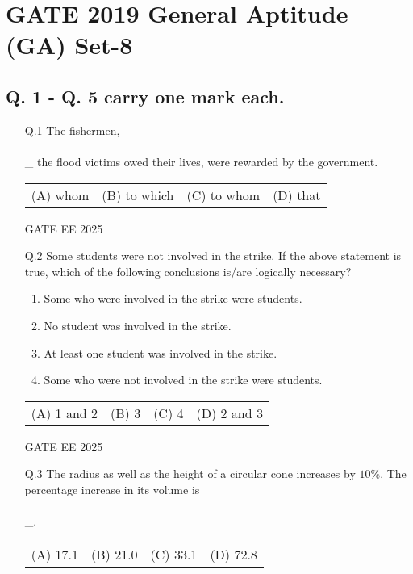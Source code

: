 \documentclass{article}
\begin{document}
\section*{GATE 2019 General Aptitude (GA) Set-8}

\subsection*{Q. 1 - Q. 5 carry one mark each.}

\begin{enumerate}[leftmargin=*]
    \item[Q.1] The fishermen, \\\\\_ the flood victims owed their lives, were rewarded by the government.
    
    \begin{tabular}{llll}
        (A) whom & (B) to which & (C) to whom & (D) that
    \end{tabular}
    
    GATE EE 2025
   \vspace{0.5cm} 
    \item[Q.2] Some students were not involved in the strike. If the above statement is true, which of the following conclusions is/are logically necessary?
    
    \begin{enumerate}[label=(\arabic*)]
        \item Some who were involved in the strike were students.
        \item No student was involved in the strike.
        \item At least one student was involved in the strike.
        \item Some who were not involved in the strike were students.
    \end{enumerate}
     \vspace{0.5cm} 
    \begin{tabular}{llll}
        (A) 1 and 2 & (B) 3 & (C) 4 & (D) 2 and 3
    \end{tabular}
    
    GATE EE 2025
    
    \item[Q.3] The radius as well as the height of a circular cone increases by $10\%$. The percentage increase in its volume is \\\\\_.
    
    \begin{tabular}{llll}
        (A) 17.1 & (B) 21.0 & (C) 33.1 & (D) 72.8
    \end{tabular}
    

\end{enumerate}
\end{document}
